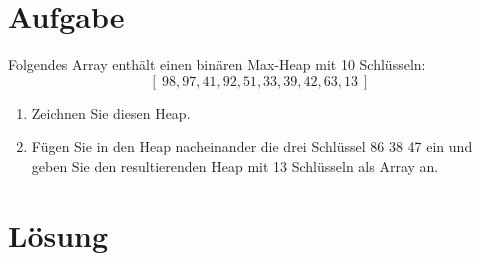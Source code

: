 \documentclass{article}
\begin{document}
\section*{Aufgabe}
Folgendes Array enthält einen binären Max-Heap mit 10 Schlüsseln:
\[[\  98, 97, 41, 92, 51, 33, 39, 42, 63, 13\ ]\]
\begin{enumerate}[label=$\alph*)$]
    \item Zeichnen Sie diesen Heap.
    \item Fügen Sie in den Heap nacheinander die drei Schlüssel 86 38 47 ein
    und geben Sie den resultierenden Heap mit 13 Schlüsseln als Array
    an.
\end{enumerate}

\section*{Lösung}
\end{document}
